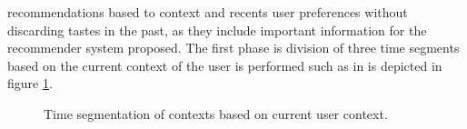 recommendations based to context and recents user preferences without
discarding tastes in the past, as they include important information
for the recommender system proposed. The first phase is division of
three time segments based on the current context of the user is
performed such as in is depicted in figure \ref{fig:context-ml}.
\begin{figure}
\captionsetup{justification=centering,margin=2cm,font=footnotesize}
\centering
\setlength\fboxsep{0pt}
\caption{Time segmentation of contexts based on current user
context.}
\label{fig:context-ml}     
\end{figure}

